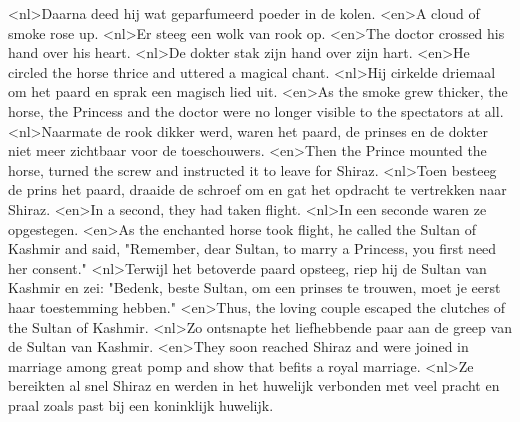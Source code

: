 <nl>Daarna deed hij wat geparfumeerd poeder in de kolen.
<en>A cloud of smoke rose up.
<nl>Er steeg een wolk van rook op.
<en>The doctor crossed his hand over his heart.
<nl>De dokter stak zijn hand over zijn hart.
<en>He circled the horse thrice and uttered a magical chant.
<nl>Hij cirkelde driemaal om het paard en sprak een magisch lied uit.
<en>As the smoke grew thicker, the horse, the Princess and the doctor were no longer visible to the spectators at all.
<nl>Naarmate de rook dikker werd, waren het paard, de prinses en de dokter niet meer zichtbaar voor de toeschouwers.
<en>Then the Prince mounted the horse, turned the screw and instructed it to leave for Shiraz.
<nl>Toen besteeg de prins het paard, draaide de schroef om en gat  het opdracht te vertrekken  naar Shiraz.
<en>In a second, they had taken flight.
<nl>In een seconde waren ze opgestegen.
<en>As the enchanted horse took flight, he called the Sultan of Kashmir and said, "Remember, dear Sultan, to marry a Princess, you first need her consent."
<nl>Terwijl het betoverde paard opsteeg, riep hij de Sultan van Kashmir en zei: "Bedenk, beste Sultan, om een prinses te trouwen, moet je eerst haar toestemming hebben."
<en>Thus, the loving couple escaped the clutches of the Sultan of Kashmir.
<nl>Zo ontsnapte het liefhebbende paar aan de greep van de Sultan van Kashmir.
<en>They soon reached Shiraz and were joined in marriage among great pomp and show that befits a royal marriage.
<nl>Ze bereikten al snel Shiraz en werden in het huwelijk verbonden met veel pracht en praal zoals past bij  een koninklijk huwelijk.
